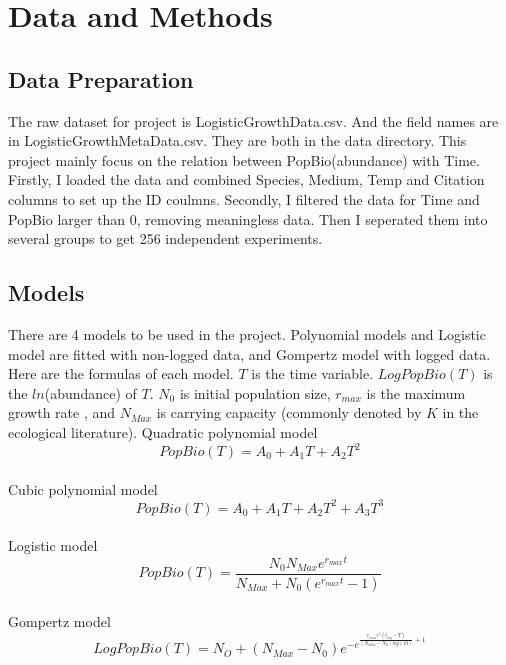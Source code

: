 \documentclass[11pt]{article}
\begin{document}
 \section{Data and Methods}

  \subsection{Data Preparation}
    The raw dataset for project is LogisticGrowthData.csv. And the field names are in LogisticGrowthMetaData.csv. They are both in the data directory.
    This project mainly focus on the relation between PopBio(abundance) with Time. Firstly, I loaded the data and combined Species, Medium, Temp and Citation columns to set up the ID coulmns. Secondly, I filtered the data for Time and PopBio larger than 0, removing meaningless data. Then I seperated them into several groups to get 256 independent experiments.

  \subsection{Models} 
    
    There are 4 models to be used in the project. Polynomial models and Logistic model are fitted with non-logged data, and Gompertz model with logged data. 
    Here are the formulas of each model. $T$ is the time variable. $LogPopBio(T)$ is the $ln$(abundance) of $T$. $N_0$ is initial population size, $r_{max}$ is the maximum growth rate , and $N_{Max}$ is carrying capacity (commonly denoted by $K$ in the ecological literature).
\newline 
Quadratic polynomial model 
\begin{equation} PopBio(T) = A_0 + A_1 T + A_2 T^2 \end{equation}  \\ 
Cubic polynomial model
\begin{equation} PopBio(T) = A_0 + A_1 T + A_2 T^2 + A_3 T^3 \end{equation}  \\      
Logistic model 
\begin{equation} PopBio(T) = \frac{N_0 N_{Max} e^{r_{max} t}}{N_{Max}+N_0(e^{r_{max} t} - 1)}\end{equation} \\ 
Gompertz model
\begin{equation} LogPopBio(T) = N_O + (N_{Max} - N_0) e^{-e^{\frac{r_{max}  e^1  (t_{lag} - T)}{(N_{Max} - N_0)  log(10)} + 1 }}\end{equation} \\
\end{document}
